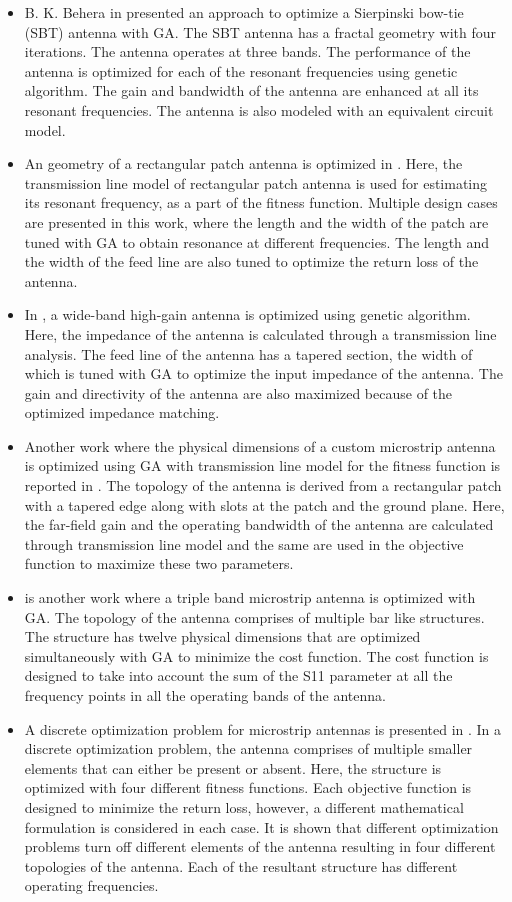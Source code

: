 \begin{itemize}
\item B. K. Behera in \cite{fractal_bowtie_ga} presented an approach to optimize a Sierpinski bow-tie (SBT) antenna with GA. The SBT antenna has a fractal geometry with four iterations. The antenna operates at three bands. The performance of the antenna is optimized for each of the resonant frequencies using genetic algorithm. The gain and bandwidth of the antenna are enhanced at all its resonant frequencies. The antenna is also modeled with an equivalent circuit model.
\item An geometry of a rectangular patch antenna is optimized in \cite{txm_opt}. Here, the transmission line model of rectangular patch antenna is used for estimating its resonant frequency, as a part of the fitness function. Multiple design cases are presented in this work, where the length and the width of the patch are tuned with GA to obtain resonance at different frequencies. The length and the width of the feed line are also tuned to optimize the return loss of the antenna.
\item In \cite{patch_feed_ga}, a wide-band high-gain antenna is optimized using genetic algorithm. Here, the impedance of the antenna is calculated through a transmission line analysis. The feed line of the antenna has a tapered section, the width of which is tuned with GA to optimize the input impedance of the antenna. The gain and directivity of the antenna are also maximized because of the optimized impedance matching.
\item Another work where the physical dimensions of a custom microstrip antenna is optimized using GA with transmission line model for the fitness function is reported in \cite{gain_bw_opt_ga}. The topology of the antenna is derived from a rectangular patch with a tapered edge along with slots at the patch and the ground plane. Here, the far-field gain and the operating bandwidth of the antenna are calculated through transmission line model and the same are used in the objective function to maximize these two parameters.
\item \cite{mpa_triband_opt} is another work where a triple band microstrip antenna is optimized with GA. The topology of the antenna comprises of multiple bar like structures. The structure has twelve physical dimensions that are optimized simultaneously with GA to minimize the cost function. The cost function is designed to take into account the sum of the S11 parameter at all the frequency points in all the operating bands of the antenna.
\item A discrete optimization problem for microstrip antennas is presented in \cite{mpa_multifit_ga}. In a discrete optimization problem, the antenna comprises of multiple smaller elements that can either be present or absent. Here, the structure is optimized with four different fitness functions. Each objective function is designed to minimize the return loss, however, a different mathematical formulation is considered in each case. It is shown that different optimization problems turn off different elements of the antenna resulting in four different topologies of the antenna. Each of the resultant structure has different operating frequencies.

\end{itemize}
